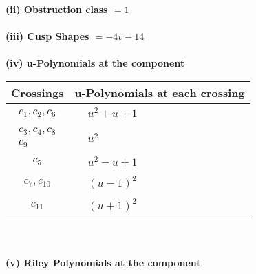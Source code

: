 \documentclass[1p]{elsarticle_modified}
\theoremstyle{definition}
\begin{document}
\flushleft \textbf{(ii) Obstruction class $= 1$}\\~\\
\flushleft \textbf{(iii) Cusp Shapes $= -4 v-14$}\\~\\
\newpage\renewcommand{\arraystretch}{1}
\flushleft \textbf{(iv) u-Polynomials at the component}\newline \\
\begin{tabular}{m{50pt}|m{274pt}}
Crossings & \hspace{64pt}u-Polynomials at each crossing \\
\hline $$\begin{aligned}c_{1},c_{2},c_{6}\end{aligned}$$&$\begin{aligned}
&u^2+u+1
\end{aligned}$\\
\hline $$\begin{aligned}c_{3},c_{4},c_{8}\\c_{9}\end{aligned}$$&$\begin{aligned}
&u^2
\end{aligned}$\\
\hline $$\begin{aligned}c_{5}\end{aligned}$$&$\begin{aligned}
&u^2- u+1
\end{aligned}$\\
\hline $$\begin{aligned}c_{7},c_{10}\end{aligned}$$&$\begin{aligned}
&(u-1)^2
\end{aligned}$\\
\hline $$\begin{aligned}c_{11}\end{aligned}$$&$\begin{aligned}
&(u+1)^2
\end{aligned}$\\
\hline
\end{tabular}\\~\\
\newpage\renewcommand{\arraystretch}{1}
\flushleft \textbf{(v) Riley Polynomials at the component}\newline \\
\end{document}
